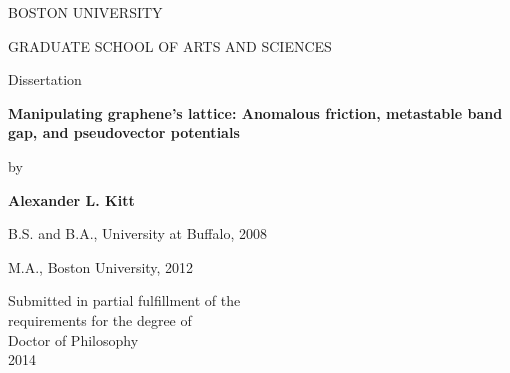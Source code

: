 \begin{titlepage}
\begin{center}

  BOSTON UNIVERSITY\\

  \vspace{1mm}

  GRADUATE SCHOOL OF ARTS AND SCIENCES\\

  \vspace{.75in}

  Dissertation\\

  \vspace{.75in}

  \textbf{Manipulating graphene's lattice: Anomalous friction, metastable band gap, and pseudovector potentials}\\

  \vspace{2mm}
  \vspace{.4in}

  by\\

  \vspace{.4in}

  {\bf Alexander L. Kitt}\\

  \vspace{1mm}

  B.S. and B.A., University at Buffalo, 2008\\

  \vspace{-1.5mm}

  M.A., Boston University, 2012

  \vspace{-2.5mm}

  \vfill

  Submitted in partial fulfillment of the\\
  requirements for the degree of\\
  Doctor of Philosophy\\
  2014\\

\end{center}
\end{titlepage}